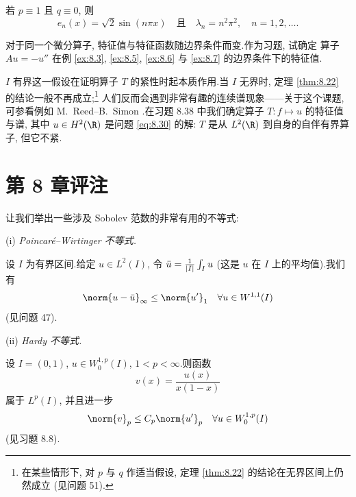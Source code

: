 \begin{example}
若 $p\equiv1$ 且 $q\equiv0$, 则
\begin{equation*}
e_n(x)=\sqrt2\sin(n\pi x)\quad\text{且}\quad\lambda_n=n^2\pi^2,
\quad n=1,2,\dots.
\end{equation*}
\end{example}

\begin{remark}
\label{rem:8.29}
对于同一个微分算子, 特征值与特征函数随边界条件而变.作为习题, 试确定
算子 $Au=-u''$ 在例 \ref{ex:8.3}, \ref{ex:8.5}, \ref{ex:8.6} 与
\ref{ex:8.7} 的边界条件下的特征值.
\end{remark}

\begin{remark}
\label{rem:8.30}
$I$ 有界这一假设在证明算子 $T$ 的紧性时起本质作用.当 $I$ 无界时, 定理
 \ref{thm:8.22} 的结论一般不再成立;\footnote{在某些情形下, 对 $p$ 与 $q$
作适当假设, 定理  \ref{thm:8.22} 的结论在无界区间上仍然成立 (见问题 51).}
人们反而会遇到非常有趣的连续谱现象——关于这个课题, 可参看例如
M.~Reed--B.~Simon .在习题 8.38 中我们确定算子
$T:f\mapsto u$ 的特征值与谱, 其中 $u\in H^2(\R)$ 是问题 \eqref{eq:8.30}
的解: $T$ 是从 $L^2(\R)$ 到自身的自伴有界算子, 但它不紧.
\end{remark}

\section*{第 8 章评注}


让我们举出一些涉及 Sobolev 范数的非常有用的不等式:

(i) \emph{Poincaré--Wirtinger 不等式.}

设 $I$ 为有界区间.给定 $u\in L^2(I)$, 令
$\bar u=\frac{1}{\left|I\right|}\int_I u$ (这是 $u$ 在 $I$ 上的平均值).我们有
\begin{equation*}
\norm{u-\bar u}_\infty\le\norm{u'}_1\quad\forall u\in W^{1,1}(I)
\end{equation*}
(见问题 47).

(ii) \emph{Hardy 不等式.}

设 $I=(0,1)$, $u\in W_0^{1,p}(I)$, $1<p<\infty$.则函数
\begin{equation*}
v(x)=\frac{u(x)}{x(1-x)}
\end{equation*}
属于 $L^p(I)$, 并且进一步
\begin{equation*}
\norm{v}_p\le C_p\norm{u'}_p\quad\forall u\in W_0^{1,p}(I)
\end{equation*}
(见习题 8.8).

